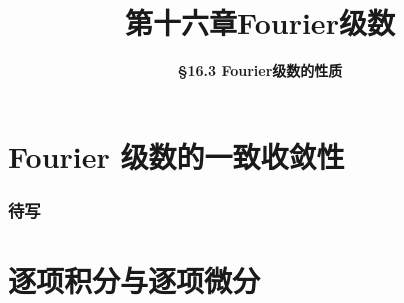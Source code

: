 \everymath{\displaystyle}



\title[第十六章\\
Fourier级数]{\texorpdfstring{\LARGE \bfseries 第十六章\quad Fourier级数}{第十六章 Fourier级数}} %
\author[\smaller \S 16.3\\
Fourier级数的性质] %
{\Large \bfseries \S 16.3 Fourier级数的性质}
\date{}





\begin{frame}

\titlepage %

\end{frame}



\section{Fourier 级数的一致收敛性}


\begin{frame}
\frametitle{待写}

\end{frame}


\section{逐项积分与逐项微分}


